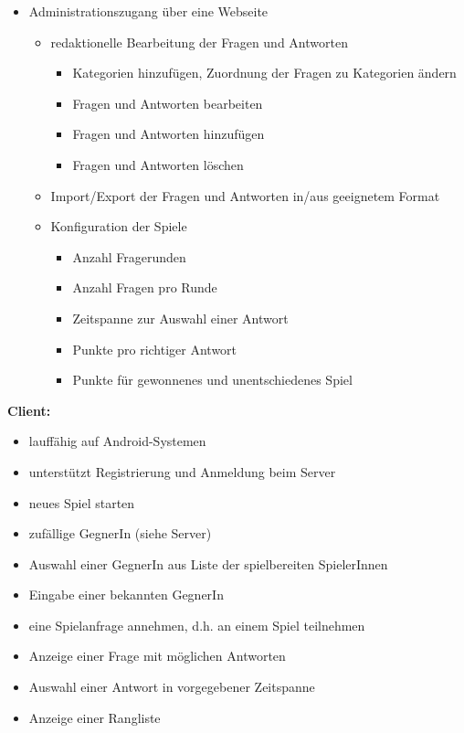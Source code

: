 \documentclass[fontsize=12pt,paper=a4,twoside]{scrartcl}
\begin{document}
\begin{itemize}
\item Administrationszugang über eine Webseite
\begin{itemize}
\item redaktionelle Bearbeitung der Fragen und Antworten
\begin{itemize}
\item Kategorien hinzufügen, Zuordnung der Fragen zu Kategorien ändern
\item Fragen und Antworten bearbeiten
\item Fragen und Antworten hinzufügen
\item Fragen und Antworten löschen
\end{itemize}
\item Import/Export der Fragen und Antworten in/aus geeignetem Format
\item Konfiguration der Spiele
\begin{itemize}
\item Anzahl Fragerunden
\item Anzahl Fragen pro Runde
\item Zeitspanne zur Auswahl einer Antwort
\item Punkte pro richtiger Antwort
\item Punkte für gewonnenes und unentschiedenes Spiel
\end{itemize}
\end{itemize}
\end{itemize}

\textbf{Client:}

\begin{itemize}
\item lauffähig auf Android-Systemen
\item unterstützt Registrierung und Anmeldung beim Server
\item neues Spiel starten
\item zufällige GegnerIn (siehe Server)
\item Auswahl einer GegnerIn aus Liste der spielbereiten SpielerInnen
\item Eingabe einer bekannten GegnerIn
\item eine Spielanfrage annehmen, d.h. an einem Spiel teilnehmen
\item Anzeige einer Frage mit möglichen Antworten
\item Auswahl einer Antwort in vorgegebener Zeitspanne
\item Anzeige einer Rangliste
\end{itemize}
\end{document}
